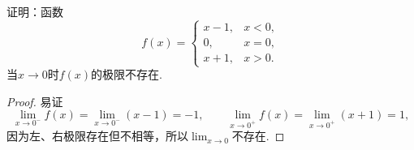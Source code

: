 \begin{example}
证明：函数\begin{equation*}
	f(x) = \left\{ \begin{array}{lc}
		x-1, & x<0, \\
		0, & x=0, \\
		x+1, & x>0.
	\end{array} \right.
\end{equation*}当\(x\to0\)时\(f(x)\)的极限不存在.
\begin{proof}
易证\begin{equation*}
	\lim_{x\to0^-} f(x) = \lim_{x\to0^-} (x-1) = -1,
	\qquad
	\lim_{x\to0^+} f(x) = \lim_{x\to0^+} (x+1) = 1,
\end{equation*}
因为左、右极限存在但不相等，所以\(\lim_{x\to0}\)不存在.
\end{proof}
\end{example}

